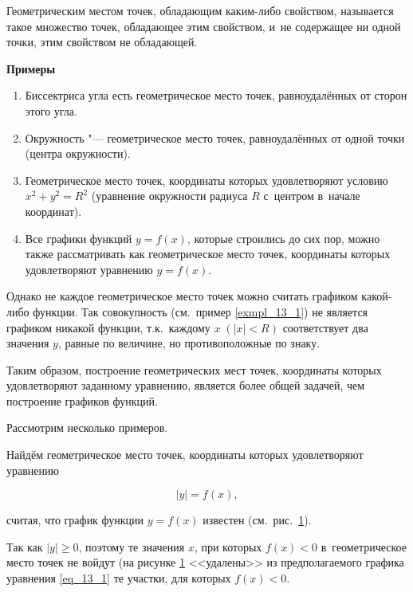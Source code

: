 \begin{Defi}
Геометрическим местом точек, обладающим каким-либо свойством, называется такое
множество точек, обладающее этим свойством, и~не содержащее ни одной точки,
этим свойством не обладающей.
\end{Defi}

\textbf{Примеры}
\begin{enumerate}
\item Биссектриса угла есть геометрическое место точек, равноудалённых
от сторон этого угла.
\item Окружность "--- геометрическое место точек, равноудалённых от одной точки
(центра окружности).
\item Геометрическое место точек, координаты которых удовлетворяют условию
$x^{2} + y^{2} = R^{2}$ (уравнение окружности радиуса $R$ с~центром
в~начале координат).\label{exmpl_13_1}
\item Все графики функций $y = f(x)$, которые строились до сих пор,
можно также рассматривать как геометрическое место точек,
координаты которых удовлетворяют уравнению $y = f(x)$.
\end{enumerate}

Однако не каждое геометрическое место точек можно считать графиком какой-либо
функции. Так совокупность (см.\ пример \ref{exmpl_13_1}) не является графиком никакой функции,
т.к.\ каждому $x \;(|x| < R)$ соответствует два значения $y$, равные по величине,
но противоположные по знаку.

Таким образом, построение геометрических мест точек, координаты которых
удовлетворяют заданному уравнению, является более общей задачей,
чем построение графиков функций.

Рассмотрим несколько примеров.

Найдём геометрическое место точек, координаты которых удовлетворяют уравнению

\begin{equation}\label{eq_13_1}
|y| = f(x),
\end{equation}

считая, что график функции $y = f(x)$ известен (см.\ рис.\ \ref{fig_13_1}).

\begin{figure}\label{fig_13_1}
\end{figure}

Так как $|y| \geqslant 0$, поэтому те значения $x$, при которых
$f(x) < 0$ в~геометрическое место точек не войдут (на рисунке \ref{fig_13_1}
<<удалены>> из предполагаемого графика уравнения \eqref{eq_13_1}
те участки, для которых $f(x) < 0$.

